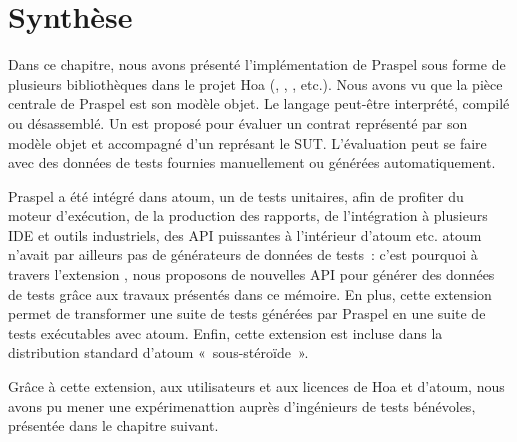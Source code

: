 \section{Synthèse}

Dans ce chapitre, nous avons présenté l'implémentation de Praspel sous forme de
plusieurs bibliothèques dans le projet Hoa (,
, ,
 etc.). Nous avons vu que la pièce centrale de Praspel
est son modèle objet. Le langage peut-être interprété, compilé ou désassemblé.
Un  est proposé pour évaluer un contrat
représenté par son modèle objet et accompagné d'un 
représant le SUT. L'évaluation peut se faire avec des données de tests fournies
manuellement ou générées automatiquement.

Praspel a été intégré dans atoum, un  de tests unitaires,
afin de profiter du moteur d'exécution, de la production des rapports, de
l'intégration à plusieurs IDE et outils industriels, des API puissantes à
l'intérieur d'atoum etc. atoum n'avait par ailleurs pas de générateurs de
données de tests~: c'est pourquoi à travers l'extension
, nous proposons de nouvelles API pour
générer des données de tests grâce aux travaux présentés dans ce mémoire. En
plus, cette extension permet de transformer une suite de tests générées par
Praspel en une suite de tests exécutables avec atoum. Enfin, cette extension est
incluse dans la distribution standard d'atoum «~sous-stéroïde~».

Grâce à cette extension, aux utilisateurs et aux licences
 de Hoa et d'atoum, nous avons pu mener une
expérimenattion auprès d'ingénieurs de tests bénévoles, présentée dans le
chapitre suivant.
